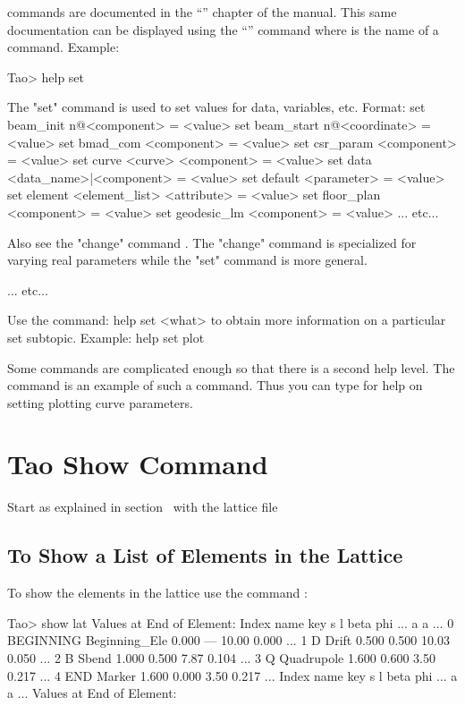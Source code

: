 \documentclass{hitec}
\newcommand{\Section}[1]{\section{#1}\vspace*{-1ex}}
\begin{document}
\tao commands are documented in the ``'' chapter of the \tao manual.
This same documentation can be displayed using the ``'' command where
 is the name of a command. Example:
\begin{code}
Tao> help set

The "set" command is used to set values for data,
variables, etc. Format:
  set beam_init {n@}<component> = <value>
  set beam_start {n@}<coordinate> = <value>
  set bmad_com <component> = <value>
  set csr_param <component> = <value>
  set curve <curve> <component> = <value>
  set data <data_name>|<component> = <value>
  set default <parameter> = <value>
  set element <element_list> <attribute> = <value>
  set floor_plan <component> = <value>
  set geodesic_lm <component> = <value>
... etc...

Also see the "change" command . The "change" command is specialized
for varying real parameters while the "set" command is more general.

... etc...

Use the command:
  help set <what>
to obtain more information on a particular set subtopic. Example:
  help set plot
\end{code}

Some commands are complicated enough so that there is a second help level. The  command is
an example of such a command. Thus you can type  for help on setting plotting
curve parameters.

\Section{Tao Show Command}

Start \tao as explained in section~ with the lattice file

\subsection{To Show a List of Elements in the Lattice}

To show the elements in the lattice use the command :
\begin{code}
 Tao> show lat
      Values at End of Element:
 Index  name      key                       s       l    beta     phi ...
                                                            a       a ...
     0  BEGINNING Beginning_Ele         0.000     ---   10.00   0.000 ...
     1  D         Drift                 0.500   0.500   10.03   0.050 ...
     2  B         Sbend                 1.000   0.500    7.87   0.104 ...
     3  Q         Quadrupole            1.600   0.600    3.50   0.217 ...
     4  END       Marker                1.600   0.000    3.50   0.217 ...
 Index  name      key                       s       l    beta     phi ...
                                                            a       a ...
      Values at End of Element:
\end{code}
\end{document}
